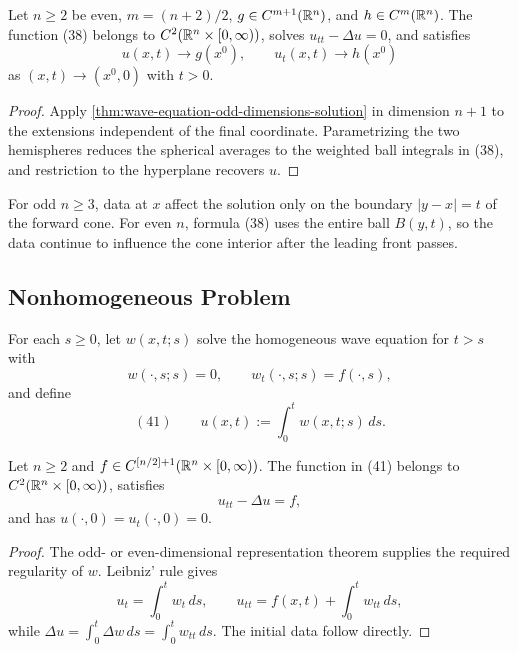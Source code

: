 \begin{theorem}
\label{thm:wave-equation-even-dimensions-solution}

Let $n\ge2$ be even, $m=(n+2)/2$, $g\in C^{m+1}(\mathbb{R}^n)$, and
$h\in C^m(\mathbb{R}^n)$. The function (38) belongs to
$C^2(\mathbb{R}^n\times[0,\infty))$, solves $u_{tt}-\Delta u=0$, and satisfies
$$u(x,t)\to g(x^0),
\qquad
u_t(x,t)\to h(x^0)$$
as $(x,t)\to(x^0,0)$ with $t>0$.
\end{theorem}
\begin{proof}
\sketch Apply \cref{thm:wave-equation-odd-dimensions-solution} in dimension
$n+1$ to the extensions independent of the final coordinate. Parametrizing
the two hemispheres reduces the spherical averages to the weighted ball
integrals in (38), and restriction to the hyperplane recovers $u$.
\end{proof}

\begin{remark}
\label{rem:huygens-principle}

For odd $n\ge3$, data at $x$ affect the solution only on the boundary
$|y-x|=t$ of the forward cone. For even $n$, formula (38) uses the entire ball
$B(y,t)$, so the data continue to influence the cone interior after the
leading front passes.
\end{remark}

\subsection{Nonhomogeneous Problem}
\label{sec:wave-nonhomogeneous-problem}

For each $s\ge0$, let $w(x,t;s)$ solve the homogeneous wave equation for
$t>s$ with
$$w(\cdot,s;s)=0,
\qquad
w_t(\cdot,s;s)=f(\cdot,s),$$
and define
$$(41)\qquad u(x,t):=\int_0^t w(x,t;s)\,ds.$$

\begin{theorem}
\label{thm:wave-equation-nonhomogeneous-duhamel}

Let $n\ge2$ and $f\in C^{[n/2]+1}(\mathbb{R}^n\times[0,\infty))$. The function
in (41) belongs to $C^2(\mathbb{R}^n\times[0,\infty))$, satisfies
$$u_{tt}-\Delta u=f,$$
and has $u(\cdot,0)=u_t(\cdot,0)=0$.
\end{theorem}
\begin{proof}
\sketch The odd- or even-dimensional representation theorem supplies the
required regularity of $w$. Leibniz' rule gives
$$u_t=\int_0^t w_t\,ds,
\qquad
u_{tt}=f(x,t)+\int_0^t w_{tt}\,ds,$$
while $\Delta u=\int_0^t\Delta w\,ds=\int_0^t w_{tt}\,ds$. The initial data
follow directly.
\end{proof}


